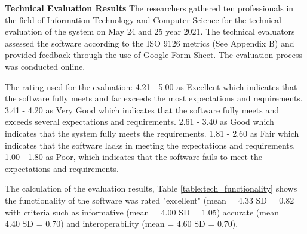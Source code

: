 \flushleft
\textbf{Technical Evaluation Results}
\justifying
\parx
The researchers gathered ten professionals in the field of Information
Technology and Computer Science for the technical evaluation of the system on
May 24 and 25 year 2021. The technical evaluators assessed the software
according to the ISO 9126 metrics (See Appendix B) and provided feedback
through the use of Google Form Sheet. The evaluation process was conducted
online.

\parx
The rating used for the evaluation: 4.21 - 5.00 as Excellent which indicates that the
software fully meets and far exceeds the most expectations and requirements.
3.41 - 4.20 as Very Good which indicates that the software fully meets and exceeds
several expectations and requirements. 2.61 - 3.40 as Good which indicates that the
system fully meets the requirements. 1.81 - 2.60 as Fair which indicates that the software
lacks in meeting the expectations and requirements. 1.00 - 1.80 as Poor, which
indicates that the software fails to meet the expectations and requirements.

\parx
The calculation of the evaluation results, Table \ref{table:tech_functionality} shows the
functionality of the software was rated "excellent" (mean = 4.33 SD = 0.82 with criteria
such as informative (mean = 4.00 SD = 1.05) accurate (mean = 4.40 SD = 0.70)
and interoperability (mean = 4.60 SD = 0.70).

